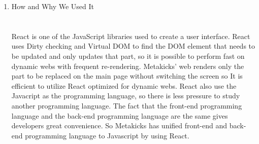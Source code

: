 \documentclass[conference]{IEEEtran}
\begin{document}
\begin{enumerate}
\item How and Why We Used It\\
\\\\React is one of the JavaScript libraries used to create a user interface. React uses Dirty checking and Virtual DOM to find the DOM element that needs to be updated and only updates that part, so it is possible to perform fast on dynamic webs with frequent re-rendering. Metakicks' web renders only the part to be replaced on the main page without switching the screen so It is efficient to utilize React optimized for dynamic webs. React also use the Javacript as the programming language, so there is less pressure to study another programming language. The fact that the front-end programming language and the back-end programming language are the same gives developers great convenience. So Metakicks has unified front-end and back-end programming language to Javascript by using React.
\end{enumerate}
\end{document}
